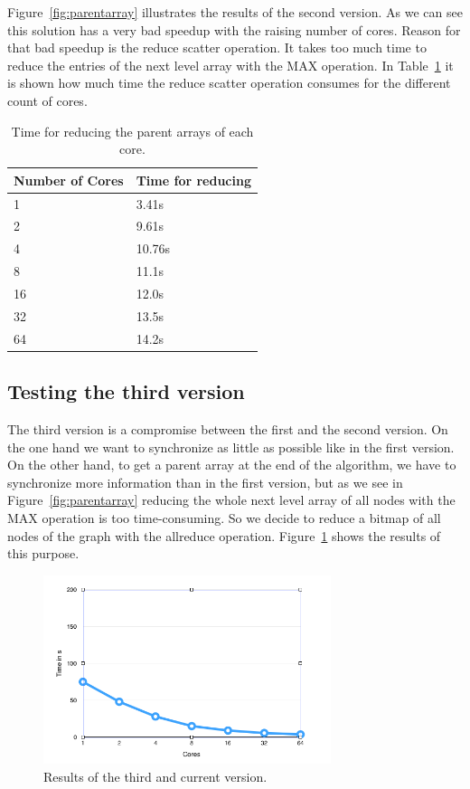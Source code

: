 \documentclass[12pt,a4paper]{article}
\begin{document}
Figure~\ref{fig:parentarray} illustrates the results of the second version. As we can see this solution has a very bad speedup with the raising number of cores. Reason for that bad speedup is the reduce scatter operation. It takes too much time to reduce the entries of the next level array with the MAX operation. In Table~\ref{tab:reducescatter} it is shown how much time the reduce scatter operation consumes for the different count of cores.

\begin{table}[!ht]
	\centering
	\begin{tabular}{ | l | l |}
  		\hline
  		Number of Cores & Time for reducing \\ \hline
  		1 & 3.41s \\ \hline
		2 & 9.61s \\ \hline
		4 & 10.76s \\ \hline
		8 & 11.1s \\ \hline
		16 & 12.0s \\ \hline
		32 & 13.5s \\ \hline
		64 & 14.2s \\ \hline
	\end{tabular}
	\caption{Time for reducing the parent arrays of each core.}
  	\label{tab:reducescatter}
\end{table}

\subsection{Testing the third version}

The third version is a compromise between the first and the second version. On the one hand we want to synchronize as little as possible like in the first version. On the other hand, to get a parent array at the end of the algorithm, we have to synchronize more information than in the first version, but as we see in Figure~\ref{fig:parentarray} reducing the whole next level array of all nodes with the MAX operation is too time-consuming. So we decide to reduce a bitmap of all nodes of the graph with the allreduce operation. Figure~\ref{fig:allvisited} shows the results of this purpose.

\begin{figure}[H]
   \centering
   \includegraphics[width=0.75\textwidth]{allvisited}
   \caption{Results of the third and current version.}
   \label{fig:allvisited}
\end{figure}
\end{document}

